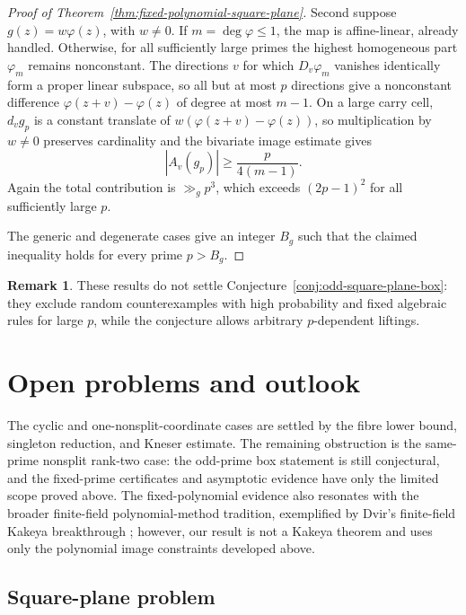 \documentclass[reqno]{amsart}
\numberwithin{equation}{section}
\theoremstyle{definition}
\newtheorem{remark}[theorem]{Remark}
\begin{document}
\begin{proof}[Proof of Theorem~\ref{thm:fixed-polynomial-square-plane}]
Second suppose \(g(z)=w\varphi(z)\), with \(w\neq 0\).  If
\(m=\deg\varphi\leq 1\), the map is affine-linear, already handled.  Otherwise,
for all sufficiently large primes the highest homogeneous part \(\varphi_m\)
remains nonconstant.  The directions \(v\) for which \(D_v\varphi_m\) vanishes
identically form a proper linear subspace, so all but at most \(p\) directions
give a nonconstant difference \(\varphi(z+v)-\varphi(z)\) of degree at most
\(m-1\).  On a large carry cell, \(d_v g_p\) is a constant translate of
\(w(\varphi(z+v)-\varphi(z))\), so multiplication by \(w\neq 0\) preserves
cardinality and the bivariate image estimate gives
\[
  |A_v(g_p)|\geq \frac{p}{4(m-1)}.
\]
Again the total contribution is \(\gg_g p^3\), which exceeds \((2p-1)^2\) for
all sufficiently large \(p\).

The generic and degenerate cases give an integer $B_g$ such that the claimed
inequality holds for every prime $p>B_g$.
\end{proof}

\begin{remark}
These results do not settle Conjecture~\ref{conj:odd-square-plane-box}: they
exclude random counterexamples with high probability and fixed algebraic rules
for large \(p\), while the conjecture allows arbitrary \(p\)-dependent liftings.
\end{remark}

\section{Open problems and outlook}
\label{sec:open-problems-outlook}

The cyclic and one-nonsplit-coordinate cases are settled by the fibre lower
bound, singleton reduction, and Kneser estimate.  The remaining obstruction is
the same-prime nonsplit rank-two case: the odd-prime box statement is still
conjectural, and the fixed-prime certificates and asymptotic evidence have only
the limited scope proved above. The fixed-polynomial evidence also resonates with the broader finite-field
polynomial-method tradition, exemplified by Dvir's finite-field Kakeya
breakthrough \cite{Dvir2009}; however, our result is not a
Kakeya theorem and uses only the polynomial image constraints developed above.

\subsection{Square-plane problem}
\end{document}
